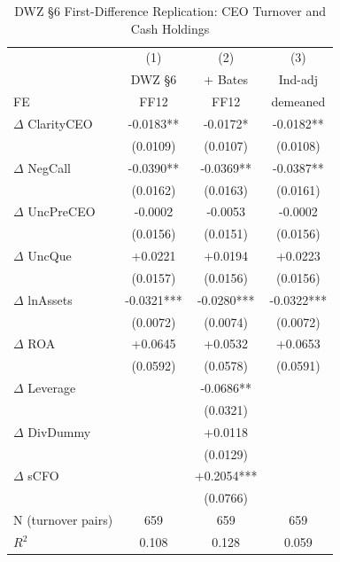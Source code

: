 \begin{table}[!htbp]
\centering\footnotesize
\caption{DWZ \S 6 First-Difference Replication: CEO Turnover and Cash Holdings}
\label{tab:h_dwz_fd}
\begin{tabular}{lccc}
\toprule
 & (1) & (2) & (3) \\
 & DWZ \S 6 & + Bates & Ind-adj \\
FE & FF12 & FF12 & demeaned \\
\midrule
$\Delta$ ClarityCEO & -0.0183** & -0.0172* & -0.0182** \\
 & (0.0109) & (0.0107) & (0.0108) \\
$\Delta$ NegCall & -0.0390** & -0.0369** & -0.0387** \\
 & (0.0162) & (0.0163) & (0.0161) \\
$\Delta$ UncPreCEO & -0.0002 & -0.0053 & -0.0002 \\
 & (0.0156) & (0.0151) & (0.0156) \\
$\Delta$ UncQue & +0.0221 & +0.0194 & +0.0223 \\
 & (0.0157) & (0.0156) & (0.0156) \\
$\Delta$ lnAssets & -0.0321*** & -0.0280*** & -0.0322*** \\
 & (0.0072) & (0.0074) & (0.0072) \\
$\Delta$ ROA & +0.0645 & +0.0532 & +0.0653 \\
 & (0.0592) & (0.0578) & (0.0591) \\
$\Delta$ Leverage &  & -0.0686** &  \\
 &  & (0.0321) &  \\
$\Delta$ DivDummy &  & +0.0118 &  \\
 &  & (0.0129) &  \\
$\Delta$ sCFO &  & +0.2054*** &  \\
 &  & (0.0766) &  \\
\midrule
N (turnover pairs) & 659 & 659 & 659 \\
$R^2$ & 0.108 & 0.128 & 0.059 \\
\bottomrule
\end{tabular}

\end{table}
